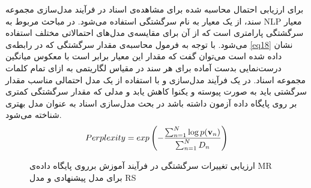 \documentclass[12pt,a4paper]{article}
\begin{document}
برای ارزیابی احتمال محاسبه شده برای مشاهده‌ی اسناد در فرآیند مدل‌سازی مجموعه سند، از یک معیار به نام سرگشتگی استفاده می‌‌شود.
در مباحث مربوط به NLP معیار سرگشتگی پارامتری است که از آن برای مقایسه‌ی مدل‌های احتمالاتی مختلف استفاده می‌شود. با توجه به فرمول محاسبه‌ی مقدار سرگشتگی که در رابطه‌ی
\ref{eq18}
نشان داده شده است می‌‌توان گفت که مقدار این معیار برابر است با معکوس میانگین درست‌نمایی بدست آماده برای هر سند در مقیاس لگاریتمی به ازای تمام کلمات مجموعه اسناد. در یک فرآیند مدل‌سازی و با استفاده از یک مدل احتمالی‌ مناسب مقدار سرگشتی باید به صورت پیوسته و یکنوا کاهش یابد و مدلی که مقدار سرگشتگی کمتری بر روی پایگاه داده آزمون داشته باشد در بحث مدل‌سازی اسناد به عنوان مدل بهتری شناخته می‌‌شود.
\begin{align}
\centering
\label{eq18}
Perplexity = exp\left( - \dfrac{\sum_{n=1}^{N}\log p(\textbf{v}_n)}{\sum_{n=1}^{N}D_n} \right)
\end{align}
\begin{figure}[!t]
	\centering
	\caption{ارزیابی تغییرات سرگشتگی در فرآیند آموزش برروی پایگاه داده‌ی MR  برای مدل پیشنهادی و مدل RS}
	\label{fig4}
\end{figure}
\end{document}
